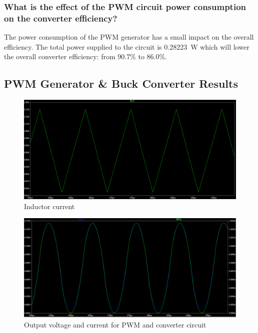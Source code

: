 \subsubsection{What is the effect of the PWM circuit power consumption on the converter efficiency?}
The power consumption of the PWM generator has a small impact on the overall efficiency. The total power supplied to the circuit is \SI{0.28223}{\watt} which will lower the overall converter efficiency: from 90.7\% to 86.0\%.

\subsection{PWM Generator \& Buck Converter Results}

\begin{figure}
	\centering
	\includegraphics[width=\linewidth]{img/IL}
	\caption{Inductor current}
	\label{fig:il}
\end{figure}

\begin{figure}
	\centering
	\includegraphics[width=\linewidth]{img/VoIo}
	\caption{Output voltage and current for PWM and converter circuit}
	\label{fig:voio}
\end{figure}

